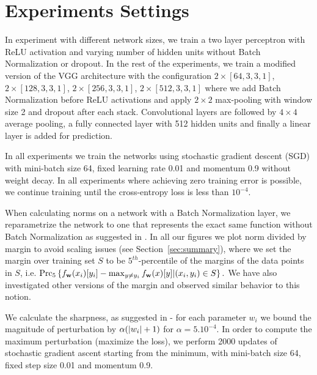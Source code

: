 \documentclass{article}
\begin{document}



\appendix


\section{Experiments Settings}
In experiment with different network sizes, we train a two layer perceptron with ReLU activation and varying number of hidden units without Batch Normalization or dropout. In the rest of the experiments, we train a modified version of the VGG architecture \cite{simonyan2014very} with the configuration $2\times [64,3,3,1]$, $2\times [128,3,3,1]$, $2\times [256,3,3,1]$, $2\times [512,3,3,1]$ where we add Batch Normalization before ReLU activations and apply $2\times 2$ max-pooling with window size 2 and dropout after each stack. Convolutional layers are followed by $4\times 4$ average pooling, a fully connected layer with 512 hidden units and finally a linear layer is added for prediction. 

In all experiments we train the networks using stochastic gradient descent (SGD) with mini-batch size 64, fixed learning rate 0.01 and momentum 0.9 without weight decay. In all experiments where achieving zero training error is possible, we continue training until the cross-entropy loss is less than $10^{-4}$.

When calculating norms on a network with a Batch Normalization layer, we reparametrize the network to one that represents the exact same function without Batch Normalization as suggested in \cite{neyshabur16}. In all our figures we plot norm divided by margin to avoid scaling issues (see Section~\ref{sec:summary}), where we set the margin over training set $S$ to be $5^{th}$-percentile of the margins of the data points in $S$, i.e. $\text{Prc}_5\left\{f_{\mathbf{w}}(x_i)[y_i] - \max_{y\neq y_i} f_{\mathbf{w}}(x)[y] | (x_i,y_i)\in S\right\}.$ We have also investigated other versions of the margin and observed similar behavior to this notion. 

We calculate the sharpness, as suggested in \cite{keskar2016large} - for each parameter $w_i$ we bound the magnitude of perturbation by $\alpha(\left\lvert{w_i}\right\rvert+1)$ for $\alpha=5.10^{-4}$. In order to compute the maximum perturbation (maximize the loss), we perform 2000 updates of stochastic gradient ascent starting from the minimum, with mini-batch size 64, fixed step size 0.01 and momentum 0.9.
\end{document}
